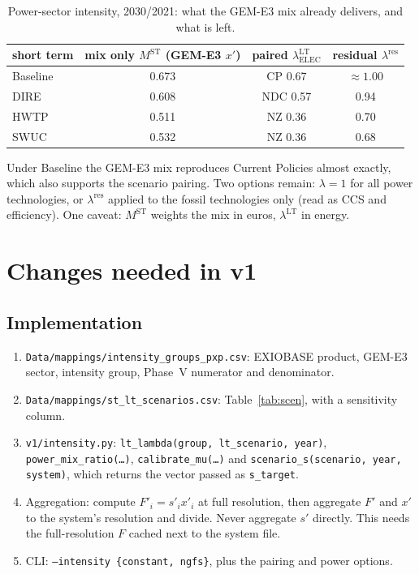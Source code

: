 \documentclass[11pt,a4paper]{article}
\newcommand{\code}[1]{\texttt{#1}}
\begin{document}
\begin{table}[h]
\centering\footnotesize
\begin{tabular}{@{}lccc@{}}
\toprule
short term & mix only $M^{\mathrm{ST}}$ (GEM-E3 $x'$) & paired $\lambda^{\mathrm{LT}}_{\mathrm{ELEC}}$ & residual $\lambda^{\mathrm{res}}$\\
\midrule
Baseline & 0.673 & CP 0.67 & $\approx 1.00$\\
DIRE     & 0.608 & NDC 0.57 & 0.94\\
HWTP     & 0.511 & NZ 0.36 & 0.70\\
SWUC     & 0.532 & NZ 0.36 & 0.68\\
\bottomrule
\end{tabular}
\caption{Power-sector intensity, 2030/2021: what the GEM-E3 mix already
delivers, and what is left.}
\label{tab:power}
\end{table}

Under Baseline the GEM-E3 mix reproduces Current Policies almost exactly,
which also supports the scenario pairing. Two options remain: $\lambda = 1$
for all power technologies, or $\lambda^{\mathrm{res}}$ applied to the fossil
technologies only (read as CCS and efficiency). One caveat: $M^{\mathrm{ST}}$
weights the mix in euros, $\lambda^{\mathrm{LT}}$ in energy.

\section{Changes needed in v1}
\label{sec:v1changes}

\subsection{Implementation}
\begin{enumerate}
  \item \code{Data/mappings/intensity\_groups\_pxp.csv}: EXIOBASE product,
        GEM-E3 sector, intensity group, Phase~V numerator and denominator.
  \item \code{Data/mappings/st\_lt\_scenarios.csv}: Table~\ref{tab:scen}, with
        a sensitivity column.
  \item \code{v1/intensity.py}: \code{lt\_lambda(group, lt\_scenario, year)},
        \code{power\_mix\_ratio(\dots)}, \code{calibrate\_mu(\dots)} and
        \code{scenario\_s(scenario, year, system)}, which returns the vector
        passed as \code{s\_target}.
  \item Aggregation: compute $F'_i = s'_i x'_i$ at full resolution, then
        aggregate $F'$ and $x'$ to the system's resolution and divide. Never
        aggregate $s'$ directly. This needs the full-resolution $F$ cached
        next to the system file.
  \item CLI: \code{--intensity \{constant, ngfs\}}, plus the pairing and power
        options.
\end{enumerate}
\end{document}

